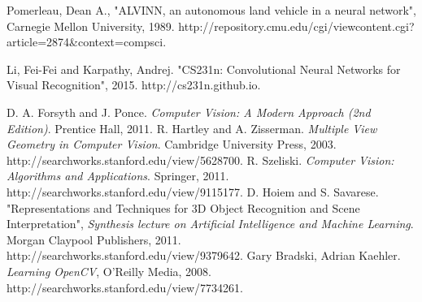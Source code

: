 \documentclass[10pt,twocolumn,letterpaper]{article}
\begin{document}
{\small


\begin{thebibliography}{1}

Pomerleau, Dean A., "ALVINN, an autonomous land vehicle in a neural network", Carnegie Mellon University, 1989. http://repository.cmu.edu/cgi/viewcontent.cgi?article=2874\&context=compsci.

Li, Fei-Fei and Karpathy, Andrej. "CS231n: Convolutional Neural Networks for Visual Recognition", 2015. http://cs231n.github.io.

D. A. Forsyth and J. Ponce. \emph{Computer Vision: A Modern Approach (2nd Edition)}. Prentice Hall, 2011.
R. Hartley and A. Zisserman. \emph{Multiple View Geometry in Computer Vision}. Cambridge University Press, 2003. http://searchworks.stanford.edu/view/5628700.
R. Szeliski. \emph{Computer Vision: Algorithms and Applications}. Springer, 2011. http://searchworks.stanford.edu/view/9115177.
D. Hoiem and S. Savarese. "Representations and Techniques for 3D Object Recognition and Scene Interpretation", \emph{Synthesis lecture on Artificial Intelligence and Machine Learning}. Morgan Claypool Publishers, 2011. http://searchworks.stanford.edu/view/9379642.
Gary Bradski, Adrian Kaehler. \emph{Learning OpenCV}, O'Reilly Media, 2008. http://searchworks.stanford.edu/view/7734261. 

\end{thebibliography}
}
\end{document}
